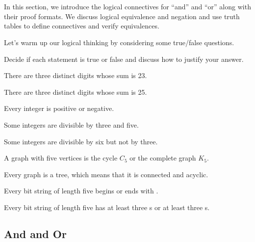\section{\seclogicconn}
\label{sec_logic_connectives}

In this section, we introduce the logical connectives for ``and'' and ``or'' along with their proof formats.  We discuss logical equivalence and negation and use truth tables to define connectives and verify equivalences.

Let's warm up our logical thinking by considering some true/false questions.

\begin{act}
\label{act_TorF}
    Decide if each statement is true or false and discuss how to justify your answer.

        \begin{actpart}
            \item \label{part_digit_sum23} There are three distinct digits whose sum is 23. %
            \item \label{part_digit_sum25} There are three distinct digits whose sum is 25. %
            \item \label{part_pos_or_neg} Every integer is positive or negative. %
            \item \label{part_div3_and_div5} Some integers are divisible by three and five. %
            \item \label{part_div6_but_ndiv3} Some integers are divisible by six but not by three. %
            \item \label{part_graph_order5} A graph with five vertices is the cycle $C_5$ or the complete graph $K_5$. %
            \item Every graph is a tree, which means that it is connected and acyclic. %
            \item Every bit string of length five begins or ends with . %
            \item \label{part_bs5_three0_or_three1} Every bit string of length five has at least three s or at least three s. %
        \end{actpart}
\end{act}

\newcommand{\subandor}{And and Or}
\subsection{\subandor}
\label{sub_and_or}

